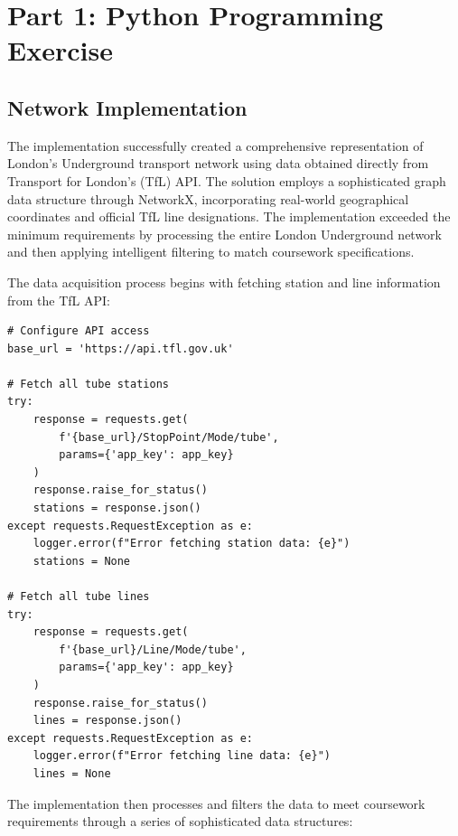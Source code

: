 \documentclass{article}
\begin{document}
\begin{cwauthorlist}
\end{cwauthorlist}

\section{Part 1: Python Programming Exercise}

\subsection{Network Implementation}

The implementation successfully created a comprehensive representation of London's Underground transport network using data obtained directly from Transport for London's (TfL) API. The solution employs a sophisticated graph data structure through NetworkX, incorporating real-world geographical coordinates and official TfL line designations. The implementation exceeded the minimum requirements by processing the entire London Underground network and then applying intelligent filtering to match coursework specifications.

The data acquisition process begins with fetching station and line information from the TfL API:

\begin{lstlisting}[style=PythonStyle, caption={TfL API Data Acquisition}]
# Configure API access
base_url = 'https://api.tfl.gov.uk'

# Fetch all tube stations
try:
    response = requests.get(
        f'{base_url}/StopPoint/Mode/tube',
        params={'app_key': app_key}
    )
    response.raise_for_status()
    stations = response.json()
except requests.RequestException as e:
    logger.error(f"Error fetching station data: {e}")
    stations = None

# Fetch all tube lines
try:
    response = requests.get(
        f'{base_url}/Line/Mode/tube',
        params={'app_key': app_key}
    )
    response.raise_for_status()
    lines = response.json()
except requests.RequestException as e:
    logger.error(f"Error fetching line data: {e}")
    lines = None
\end{lstlisting}

The implementation then processes and filters the data to meet coursework requirements through a series of sophisticated data structures:
\end{document}
